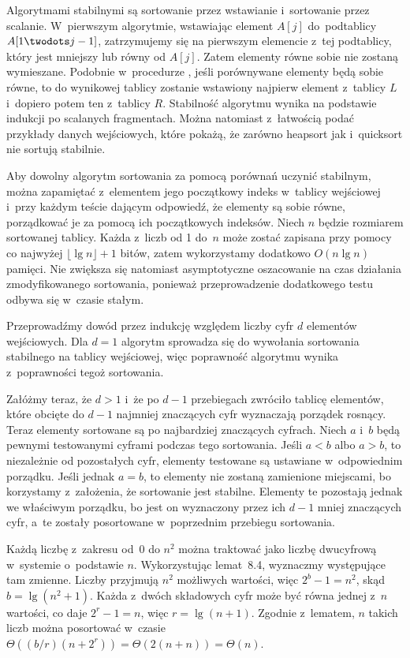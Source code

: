 \exercise %
Algorytmami stabilnymi są sortowanie przez wstawianie i~sortowanie przez scalanie. W~pierwszym algorytmie, wstawiając element $A[j]$ do~podtablicy $A[1\twodots j-1]$, zatrzymujemy się na pierwszym elemencie z~tej podtablicy, który jest mniejszy lub równy od $A[j]$. Zatem elementy równe sobie nie zostaną wymieszane. Podobnie w~procedurze , jeśli porównywane elementy będą sobie równe, to do wynikowej tablicy zostanie wstawiony najpierw element z~tablicy $L$ i~dopiero potem ten z~tablicy $R$. Stabilność algorytmu wynika na podstawie indukcji po scalanych fragmentach. Można natomiast z~łatwością podać przykłady danych wejściowych, które pokażą, że zarówno heapsort jak i~quicksort nie sortują stabilnie.

Aby dowolny algorytm sortowania za pomocą porównań uczynić stabilnym, można zapamiętać z~elementem jego początkowy indeks w~tablicy wejściowej i~przy każdym teście dającym odpowiedź, że elementy są sobie równe, porządkować je za pomocą ich początkowych indeksów. Niech $n$ będzie rozmiarem sortowanej tablicy. Każda z~liczb od 1 do~$n$ może zostać zapisana przy pomocy co najwyżej $\lfloor\lg n\rfloor+1$ bitów, zatem wykorzystamy dodatkowo $O(n\lg n)$ pamięci. Nie zwiększa się natomiast asymptotyczne oszacowanie na czas działania zmodyfikowanego sortowania, ponieważ przeprowadzenie dodatkowego testu odbywa się w~czasie stałym.

\exercise %
Przeprowadźmy dowód przez indukcję względem liczby cyfr $d$ elementów wejściowych. Dla $d=1$ algorytm sprowadza się do wywołania sortowania stabilnego na tablicy wejściowej, więc poprawność algorytmu wynika z~poprawności tegoż sortowania.

Załóżmy teraz, że $d>1$ i~że  po $d-1$ przebiegach zwróciło tablicę elementów, które obcięte do $d-1$ najmniej znaczących cyfr wyznaczają porządek rosnący. Teraz elementy sortowane są po  najbardziej znaczących cyfrach. Niech $a$ i~$b$ będą pewnymi testowanymi cyframi podczas tego sortowania. Jeśli $a<b$ albo $a>b$, to niezależnie od pozostałych cyfr, elementy testowane są ustawiane w~odpowiednim porządku. Jeśli jednak $a=b$, to elementy nie zostaną zamienione miejscami, bo korzystamy z~założenia, że sortowanie jest stabilne. Elementy te pozostają jednak we właściwym porządku, bo jest on wyznaczony przez ich $d-1$ mniej znaczących cyfr, a~te zostały posortowane w~poprzednim przebiegu sortowania.

\exercise %
Każdą liczbę z~zakresu od~0 do $n^2$ można traktować jako liczbę dwucyfrową w~systemie o~podstawie $n$. Wykorzystując lemat~8.4, wyznaczmy występujące tam zmienne. Liczby przyjmują $n^2$ możliwych wartości, więc $2^b-1=n^2$, skąd $b=\lg(n^2+1)$. Każda z~dwóch składowych cyfr może być równa jednej z~$n$ wartości, co daje $2^r-1=n$, więc $r=\lg(n+1)$. Zgodnie z~lematem, $n$ takich liczb można posortować w~czasie $\Theta((b/r)(n+2^r))=\Theta(2(n+n))=\Theta(n)$.

